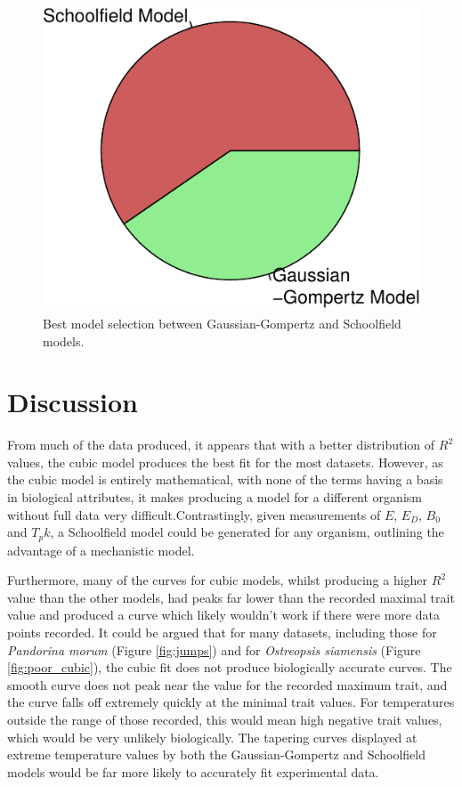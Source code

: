 \documentclass[11pt]{article}
\begin{document}
\begin{figure}[h]
\begin{center}
\includegraphics[scale = 1]{remove_cubic.pdf}
\caption{Best model selection between Gaussian-Gompertz and Schoolfield models.}
\label{fig:remove_cubic}
\end{center}
\end{figure}
\FloatBarrier
\section{Discussion}
From much of the data produced, it appears that with a better distribution of \(R^2\) values, the cubic model produces the best fit for the most datasets. However, as the cubic model is entirely mathematical, with none of the terms having a basis in biological attributes, it makes producing a model for a different organism without full data very difficult.Contrastingly, given measurements of \(E\), \(E_D\), \(B_0\) and \(T_pk\), a Schoolfield model could be generated for any organism, outlining the advantage of a mechanistic model. 

Furthermore, many of the curves for cubic models, whilst producing a higher \(R^2\) value than the other models, had peaks far lower than the recorded maximal trait value and produced a curve which likely wouldn't work if there were more data points recorded. It could be argued that for many datasets, including those for \textit{Pandorina morum} (Figure \ref{fig:jumps}) and for \textit{Ostreopsis siamensis} (Figure \ref{fig:poor_cubic}), the cubic fit does not produce biologically accurate curves. The smooth curve does not peak near the value for the recorded maximum trait, and the curve falls off extremely quickly at the minimal trait values. For temperatures outside the range of those recorded, this would mean high negative trait values, which would be very unlikely biologically. The tapering curves displayed at extreme temperature values by both the Gaussian-Gompertz and Schoolfield models would be far more likely to accurately fit experimental data.
\end{document}
